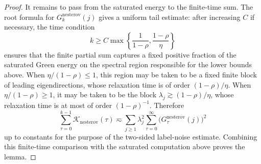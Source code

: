 \documentclass[11pt]{article}
\newcommand{\nesterov}{\mathrm{nesterov}}
\begin{document}
\begin{proof}
It remains to pass from the saturated energy to the finite-time sum.  The root formula for
\(G_k^{\nesterov}(j)\) gives a uniform tail estimate: after increasing \(C\) if necessary, the time
condition
\[
    k\ge
    C\max\left\{\frac1{1-\rho},\frac{1-\rho}{\eta}\right\}
\]
ensures that the finite partial sum captures a fixed positive fraction of the saturated Green energy on the
spectral region responsible for the lower bounds above.  When \(\eta/(1-\rho)\le1\), this region may be
taken to be a fixed finite block of leading eigendirections, whose relaxation time is of order
\((1-\rho)/\eta\).  When \(\eta/(1-\rho)\ge1\), it may be taken to be the block
\(\lambda_j\gtrsim(1-\rho)/\eta\), whose relaxation time is at most of order \((1-\rho)^{-1}\).
Therefore
\[
    \sum_{\tau=0}^{k-1}\mathcal K_{\nesterov}(\tau)
    \eqsim
    \sum_{j\ge1}\lambda_j^2
    \sum_{\tau=0}^{\infty}\bigl(G_\tau^{\nesterov}(j)\bigr)^2
\]
up to constants for the purpose of the two-sided label-noise estimate.  Combining this finite-time
comparison with the saturated computation above proves the lemma.
\end{proof}

\end{document}
